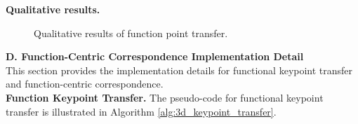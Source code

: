 \newpage




\noindent \textbf{Qualitative results.} 
\begin{figure}[h]
  \centering
    \vspace*{-0.1in}
  \caption{Qualitative results of function point transfer.}
  \label{fig:keypoint_qualitative}
\end{figure}
\newpage


\noindent \textbf{D. Function-Centric Correspondence Implementation Detail}\\
This section provides the implementation details for functional keypoint transfer and function-centric correspondence. \\

\noindent \textbf{Function Keypoint Transfer.} The pseudo-code for functional keypoint transfer is illustrated in Algorithm \ref{alg:3d_keypoint_transfer}.

